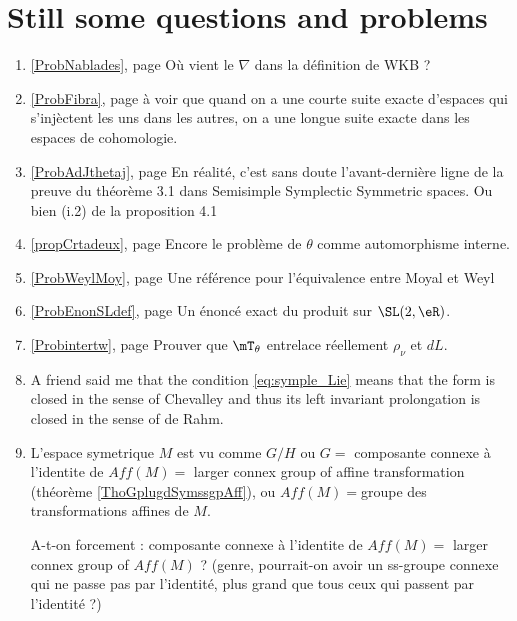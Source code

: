 
\newcommand{\refprob}[1]{\ref{#1}, page \pageref{#1}}

\section{Still some questions and problems}


\begin{enumerate}
\item \refprob{ProbNablades} Où vient le $\nabla$ dans la définition de WKB ?
 \item \refprob{ProbFibra} à voir que quand on a une courte suite exacte d'espaces qui s'injèctent les uns dans les autres, on a une longue suite exacte dans les espaces de cohomologie.
\item  \refprob{ProbAdJthetaj} En réalité, c'est sans doute l'avant-dernière ligne de la preuve du théorème 3.1 dans Semisimple Symplectic Symmetric spaces. Ou bien (i.2) de la proposition 4.1
\item \refprob{propCrtadeux} Encore le problème de $\theta$ comme automorphisme interne.

\item \refprob{ProbWeylMoy} Une référence pour l'équivalence entre Moyal et Weyl
\item \refprob{ProbEnonSLdef} Un énoncé exact du produit sur $\SL(2,\eR)$.
\item \refprob{Probintertw} Prouver que $\mT_{\theta}$ entrelace réellement $\rho_{\nu}$ et $dL$.

    \item
        A friend said me that the condition \eqref{eq:symple_Lie} means that the form is closed in the sense of Chevalley and thus its left invariant prolongation is closed in the sense of de Rahm.
    \item

	L’espace symetrique $M$ est vu comme $G/H$ ou $G =$ composante connexe à l’identite de $Aff(M) =$ larger connex group of affine transformation (théorème \ref{ThoGplugdSymssgpAff}), ou $Aff(M)=$groupe des transformations affines de $M$.

A-t-on forcement : composante connexe à l’identite de $Aff(M)  =$ larger connex group of $Aff(M)$ ?
(genre, pourrait-on avoir un ss-groupe connexe qui ne passe pas par l’identité, plus grand que tous ceux qui passent par l’identité ?) 


\end{enumerate}
